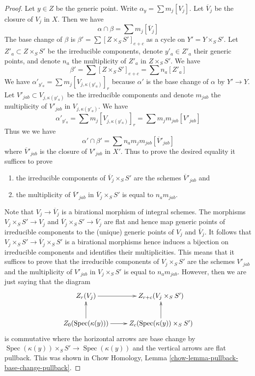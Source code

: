 \documentclass{stacks-project}
\theoremstyle{plain}
\theoremstyle{definition}
\theoremstyle{remark}
\numberwithin{equation}{subsection}
\def\Spec{\mathop{\mathrm{Spec}}}
\begin{document}
\begin{proof}
\medskip\noindent
Let $y \in Z$ be the generic point. Write $\alpha_y = \sum m_j [V_j]$.
Let $\overline{V}_j$ be the closure of $V_j$ in $X$. Then we have
$$
\alpha \cap \beta = \sum m_j[\overline{V}_j]
$$
The base change of $\beta$ is $\beta' = \sum [Z \times_S S']_{e + c}$ as a
cycle on $Y' = Y \times_S S'$. Let $Z'_a \subset Z \times_S S'$
be the irreducible components, denote $y'_a \in Z'_a$ their generic points,
and denote $n_a$ the multiplicity of $Z'_a$ in $Z \times_S S'$.
We have
$$
\beta' = \sum [Z \times_S S']_{e + c} = \sum n_a[Z'_a]
$$
We have $\alpha'_{y'_a} = \sum m_j [V_{j, \kappa(y'_a)}]_r$
because $\alpha'$ is the base change of $\alpha$ by $Y' \to Y$.
Let $V'_{jab} \subset V_{j, \kappa(y'_a)}$ be the irreducible components
and denote $m_{jab}$ the multiplicity of $V'_{jab}$
in $V_{j, \kappa(y'_a)}$. We have
$$
\alpha'_{y'_a} = \sum m_j [V_{j, \kappa(y'_a)}]_r =
\sum m_j m_{jab} [V'_{jab}]
$$
Thus we we have
$$
\alpha' \cap \beta' = \sum n_a m_j m_{jab} [\overline{V}'_{jab}]
$$
where $\overline{V}'_{jab}$ is the closure of $V'_{jab}$ in $X'$.
Thus to prove the desired equality it suffices to prove
\begin{enumerate}
\item the irreducible components of $\overline{V}_j \times_S S'$
are the schemes $\overline{V}'_{jab}$ and
\item the multiplicity of $\overline{V}'_{jab}$ in
$\overline{V}_j \times_S S'$ is equal to $n_a m_{jab}$.
\end{enumerate}
Note that $V_j \to \overline{V}_j$ is a birational morphism of
integral schemes. The morphisms $V_j \times_S S' \to V_j$
and $\overline{V}_j \times_S S' \to \overline{V}_j$ are flat
and hence map generic points of irreducible components to the
(unique) generic points of $V_j$ and $\overline{V}_j$.
It follows that $V_j \times_S S' \to \overline{V}_j \times_S S'$
is a birational morphisms hence induces a bijection on irreducible
components and identifies their multiplicities.
This means that it suffices to prove that the irreducible components of
$V_j \times_S S'$ are the schemes $V'_{jab}$ and
the multiplicity of $V'_{jab}$ in $V_j \times_S S'$
is equal to $n_a m_{jab}$. However, then we are just saying
that the diagram
$$
\xymatrix{
Z_r(V_j) \ar[r] & Z_{r + c}(V_j \times_S S') \\
Z_0(\Spec(\kappa(y))) \ar[r] \ar[u] &
Z_c(\Spec(\kappa(y)) \times_S S') \ar[u]
}
$$
is commutative where the horizontal arrows are base change by
$\Spec(\kappa(y)) \times_S S' \to \Spec(\kappa(y))$ and
the vertical arrows are flat pullback. This was shown in
Chow Homology, Lemma \ref{chow-lemma-pullback-base-change-pullback}.


\end{proof}
\end{document}
